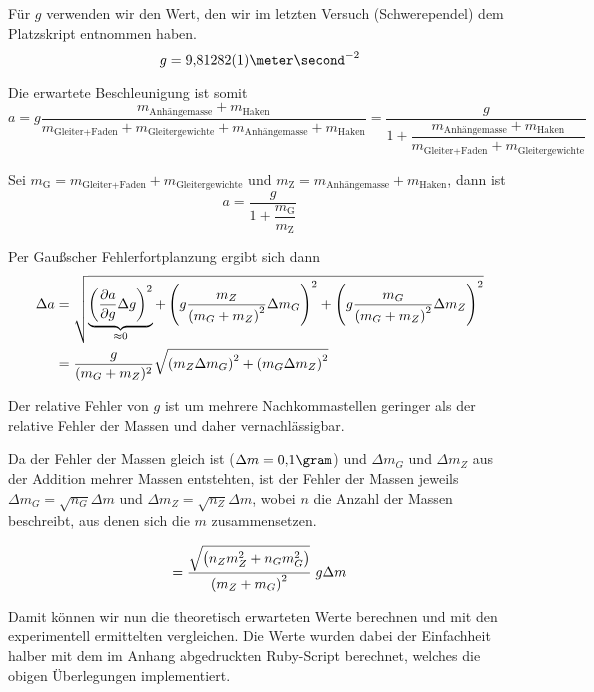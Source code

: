 \documentclass[a4paper,german,12pt,smallheadings]{scrartcl}
\begin{document}
Für $g$ verwenden wir den Wert, den wir im letzten Versuch (Schwerependel) dem
Platzskript entnommen haben.
\begin{equation}
  g = 9{,}81282(1) \meter\second^{-2}
\end{equation}

Die erwartete Beschleunigung ist somit
\begin{equation}
  a = g \frac{m_\text{Anhängemasse} + m_\text{Haken}}{m_\text{Gleiter+Faden} + m_\text{Gleitergewichte} + m_\text{Anhängemasse} + m_\text{Haken}} =
  \frac{g}{1 + \dfrac{m_\text{Anhängemasse} + m_\text{Haken}}{{m_\text{Gleiter+Faden} + m_\text{Gleitergewichte}}}}
\end{equation}

Sei $m_\text{G} = m_\text{Gleiter+Faden} + m_\text{Gleitergewichte}$ und $m_\text{Z} = m_\text{Anhängemasse} + m_\text{Haken}$, dann ist
\begin{equation}
  a = \frac{g}{1 + \dfrac{m_\text{G}}{m_\text{Z}}}
\end{equation}

Per Gaußscher Fehlerfortplanzung ergibt sich dann
\begin{align}
  \Delta a &= \sqrt{
    \underbrace{\del{\frac{\partial a}{\partial g} \Delta g}^2}_{\approx 0} +
    \del{
      g \frac{m_Z}{\del{m_G + m_Z}^2} \Delta m_G
    }^2
    +
    \del{
      g \frac{m_G}{\del{m_G + m_Z}^2} \Delta m_Z
    }^2
  } \\
  &= \frac{g}{(m_G + m_Z)^2} \sqrt{\del{m_Z \Delta m_G}^2 + \del{m_G \Delta m_Z}^2}
\end{align}

Der relative Fehler von $g$ ist um mehrere Nachkommastellen geringer als der
relative Fehler der Massen und daher vernachlässigbar.

Da der Fehler der Massen gleich ist ($\Delta m = 0{,}1 \gram$) und $\Delta m_G$
und $\Delta m_Z$ aus der Addition mehrer Massen entstehten, ist der Fehler der
Massen jeweils $\Delta m_G = \sqrt{n_G} \Delta m$ und $\Delta m_Z = \sqrt{n_Z}
\Delta m$, wobei $n$ die Anzahl der Massen beschreibt, aus denen sich die $m$
zusammensetzen.

\begin{equation}
  = \frac{\sqrt{\del{n_Z m_Z^2 + n_G m_G^2}}}{\del{m_Z + m_G}^2} \; g \Delta m
\end{equation}

Damit können wir nun die theoretisch erwarteten Werte berechnen und mit den
experimentell ermittelten vergleichen. Die Werte wurden dabei der Einfachheit
halber mit dem im Anhang abgedruckten Ruby-Script berechnet, welches die obigen
Überlegungen implementiert.
\end{document}
